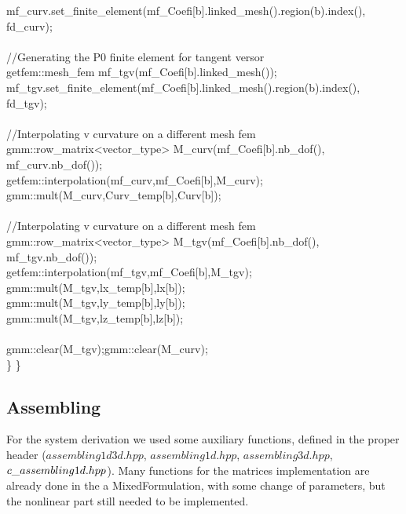 \documentclass[a4paper]{report}
\newcommand\tab[1][1cm]{\hspace*{#1}}
\begin{document}
{\tab\tab		mf\_\-curv.set\_\-finite\_\-element(mf\_\-Coefi[b].linked\_\-mesh().region(b).index(),\\ \tab \tab \tab \tab \tab \tab \tab \tab \tab fd\_\-curv);\\
\\
\tab\tab		//Generating the P0 finite element for tangent versor\\
\tab\tab		getfem::mesh\_\-fem mf\_\-tgv(mf\_\-Coefi[b].linked\_\-mesh());\\
\tab\tab		mf\_\-tgv.set\_\-finite\_\-element(mf\_\-Coefi[b].linked\_\-mesh().region(b).index(), \\ \tab \tab \tab \tab \tab \tab \tab \tab \tab fd\_\-tgv);\\
\\
\tab\tab		//Interpolating v curvature on a different mesh fem \\
\tab\tab		gmm::row\_\-matrix<vector\_\-type> M\_\-curv(mf\_\-Coefi[b].nb\_\-dof(),\\ \tab \tab \tab \tab \tab \tab \tab \tab \tab mf\_\-curv.nb\_\-dof());\\
\tab\tab		getfem::interpolation(mf\_\-curv,mf\_\-Coefi[b],M\_\-curv);\\
\tab\tab		gmm::mult(M\_\-curv,Curv\_\-temp[b],Curv[b]);\\
\\

\tab\tab		//Interpolating v curvature on a different mesh fem \\
\tab\tab		gmm::row\_\-matrix<vector\_\-type> M\_\-tgv(mf\_\-Coefi[b].nb\_\-dof(),\\ \tab \tab \tab \tab \tab \tab \tab \tab \tab mf\_\-tgv.nb\_\-dof());\\
\tab\tab		getfem::interpolation(mf\_\-tgv,mf\_\-Coefi[b],M\_\-tgv);\\
\tab\tab		gmm::mult(M\_\-tgv,lx\_\-temp[b],lx[b]);\\
\tab\tab		gmm::mult(M\_\-tgv,ly\_\-temp[b],ly[b]);\\
\tab\tab		gmm::mult(M\_\-tgv,lz\_\-temp[b],lz[b]);\\
\\
\tab\tab		gmm::clear(M\_\-tgv);\tab gmm::clear(M\_\-curv);\\
\tab	\}
\}


}
\subsection{Assembling}
For the system derivation we used some auxiliary functions, defined in the proper header ($assembling1d3d.hpp$, $assembling1d.hpp$, $assembling3d.hpp$, $c\_\-assembling1d.hpp$). Many functions for the matrices implementation are already done in the a MixedFormulation, with some change of parameters, but the nonlinear part still needed to be implemented.\\
\end{document}
